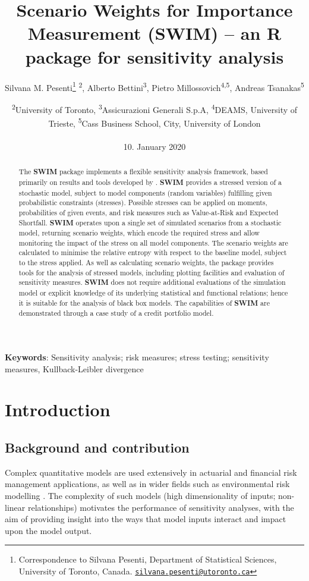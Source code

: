 \documentclass[
]{article}
\title{Scenario Weights for Importance Measurement (\textbf{SWIM}) -- an \textbf{R} package for sensitivity analysis}
\author{Silvana M. Pesenti\footnote{Correspondence to Silvana Pesenti, Department of Statistical Sciences, University of Toronto, Canada. \href{mailto:silvana.pesenti@utoronto.ca}{\nolinkurl{silvana.pesenti@utoronto.ca}}} \textsuperscript{2}, Alberto Bettini\textsuperscript{3}, Pietro Millossovich\textsuperscript{4,5}, Andreas Tsanakas\textsuperscript{5}}
\date{\textsuperscript{2}University of Toronto, \textsuperscript{3}Assicurazioni Generali S.p.A, \textsuperscript{4}DEAMS, University of Trieste, \textsuperscript{5}Cass Business School, City, University of London\\
~\\
10. January 2020}
\begin{document}
\maketitle
\begin{abstract}
The \textbf{SWIM} package implements a flexible sensitivity analysis framework, based primarily on results and tools developed by \citet{Pesenti2019}. \textbf{SWIM} provides a stressed version of a stochastic model, subject to model components (random variables) fulfilling given probabilistic constraints (stresses). Possible stresses can be applied on moments, probabilities of given events, and risk measures such as Value-at-Risk and Expected Shortfall. \textbf{SWIM} operates upon a single set of simulated scenarios from a stochastic model, returning scenario weights, which encode the required stress and allow monitoring the impact of the stress on all model components. The scenario weights are calculated to minimise the relative entropy with respect to the baseline model, subject to the stress applied. As well as calculating scenario weights, the package provides tools for the analysis of stressed models, including plotting facilities and evaluation of sensitivity measures. \textbf{SWIM} does not require additional evaluations of the simulation model or explicit knowledge of its underlying statistical and functional relations; hence it is suitable for the analysis of black box models. The capabilities of \textbf{SWIM} are demonstrated through a case study of a credit portfolio model.
\end{abstract}

\textbf{Keywords}: Sensitivity analysis; risk measures; stress testing; sensitivity measures, Kullback-Leibler divergence

\hypertarget{introduction}{%
\section{Introduction}\label{introduction}}

\hypertarget{background-and-contribution}{%
\subsection{Background and contribution}\label{background-and-contribution}}

Complex quantitative models are used extensively in actuarial and financial risk management applications, as well as in wider fields such as environmental risk modelling \citep{Tsanakas2016b, Borgonovo2016, Pesenti2019}. The complexity of such models (high dimensionality of inputs; non-linear relationships) motivates the performance of sensitivity analyses, with the aim of providing insight into the ways that model inputs interact and impact upon the model output.
\end{document}
